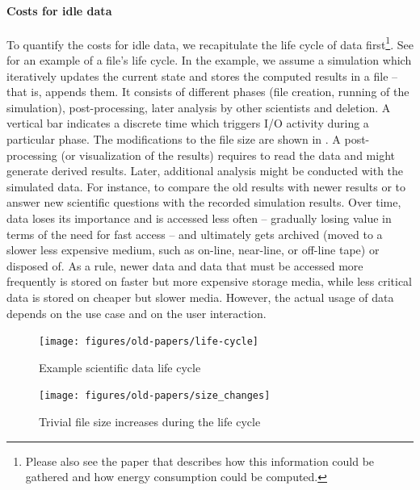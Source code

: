 \documentclass{../../template/esiwace-report}
\begin{document}
\paragraph{Costs for idle data}

To quantify the costs for idle data, we recapitulate the life cycle of data first\footnote{Please also see the paper \cite{CECOSDKMKL10} that describes how this information could be gathered and how energy consumption could be computed.}.
See  for an example of a file's life cycle.
In the example, we assume a simulation which iteratively updates the current state and stores the computed results in a file -- that is, appends them.
It consists of different phases (file creation, running of the simulation), post-processing, later analysis by other scientists and deletion.
A vertical bar indicates a discrete time which triggers I/O activity during a particular phase.
The modifications to the file size are shown in .
A post-processing (or visualization of the results) requires to read the data and might generate derived results.
Later, additional analysis might be conducted with the simulated data.
For instance, to compare the old results with newer results or to answer new scientific questions with the recorded simulation results.
Over time, data loses its importance and is accessed less often -- gradually losing value in terms of the need for fast access -- and ultimately gets archived (moved to a slower less expensive medium, such as on-line, near-line, or off-line tape) or disposed of.
As a rule, newer data and data that must be accessed more frequently is stored on faster but more expensive storage media, while less critical data is stored on cheaper but slower media.
However, the actual usage of data depends on the use case and on the user interaction.

\begin{figure}
\centering
  \texttt{[image: figures/old-papers/life-cycle]}
\caption{Example scientific data life cycle}
\label{fig:datalifecycle}
\end{figure}


\begin{figure}
\centering
  \texttt{[image: figures/old-papers/size\_changes]}
\caption{Trivial file size increases during the life cycle}
\label{fig:size_changes}
\end{figure}
\end{document}
